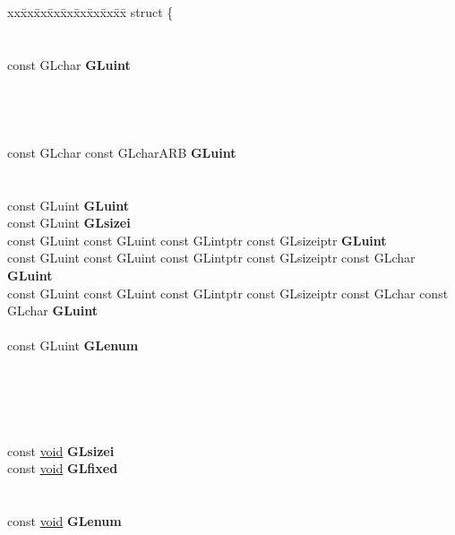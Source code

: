 \begin{DoxyCompactItemize}
\begin{tabbing}
\end{tabbing}\item 
\mbox{\label{structopengl__funcs_afc89a0adfde343d9d0e24965be0aa275}} 
\begin{tabbing}
xx\=xx\=xx\=xx\=xx\=xx\=xx\=xx\=xx\=\kill
struct \{\\
\\
\\
\>const GLchar {\bfseries GLuint}\\
\\
\\
\\
\\
\>const GLchar const GLcharARB {\bfseries GLuint}\\
\\
\\
\>const GLuint {\bfseries GLuint}\\
\>const GLuint {\bfseries GLsizei}\\
\>const GLuint const GLuint const GLintptr const GLsizeiptr {\bfseries GLuint}\\
\>const GLuint const GLuint const GLintptr const GLsizeiptr const GLchar {\bfseries GLuint}\\
\>const GLuint const GLuint const GLintptr const GLsizeiptr const GLchar const GLchar {\bfseries GLuint}\\
\\
\>const GLuint {\bfseries GLenum}\\
\\
\\
\\
\\
\\
\>const \hyperlink{interfacevoid}{void} {\bfseries GLsizei}\\
\>const \hyperlink{interfacevoid}{void} {\bfseries GLfixed}\\
\\
\\
\>const \hyperlink{interfacevoid}{void} {\bfseries GLenum}\\
\\

\end{tabbing}
\end{DoxyCompactItemize}
